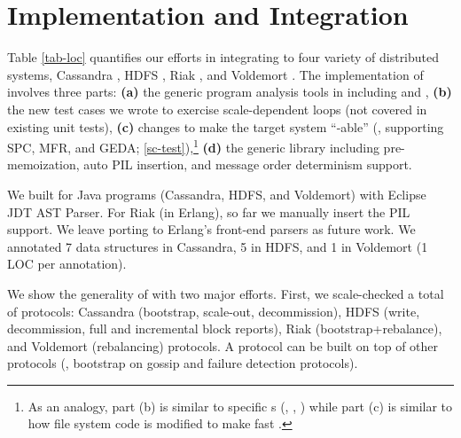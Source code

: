 

\section{Implementation and Integration}
\label{sec-impl}











Table \ref{tab-loc} quantifies our efforts
in integrating \sck 
to four variety of distributed systems, 
Cassandra \cite{Lakshman+09-Cassandra}, 
HDFS \cite{HDFSWeb}, 
Riak \cite{RiakWeb}, and
Voldemort \cite{VoldemortWeb}.
%
The implementation of \sck involves three parts:
%
{\bf (a)} the generic program analysis tools in including \sfind and
\sfindp,
%
{\bf (b)} the new test cases we wrote to 
exercise scale-dependent loops (not covered in existing unit tests),
%
{\bf (c)} changes to make the target system ``\stest-able'' (\ie,
supporting SPC, MFR, and GEDA; \sec\ref{sc-test}),\footnote{As an analogy,
  part (b) is similar to specific s (\eg, ,
  ) while part (c) is similar to how file system code is
  modified to make  fast \cite{Henson+06-Chunkfs, Ma+13-Ffsck}.}
%
{\bf (d)} the generic \stest library including
pre-memoization, auto PIL insertion, and message order determinism support.
%


We built \sfind for Java programs (Cassandra, HDFS, and Voldemort) with
Eclipse JDT AST Parser.  For Riak (in Erlang), so far we manually insert
the PIL support.  We leave porting \sfind to Erlang's front-end parsers
\cite{Erlang-Elvis, Erlang-Dialyzer} as future work.
%
We annotated 7 data structures in Cassandra, 
5 in HDFS, and 1 in Voldemort (1 LOC per annotation).




 We show the generality of \sck with two major
efforts.  First, we scale-checked a total of \numProt protocols:
%
\numProtCass Cassandra (bootstrap, scale-out, decommission),
%
\numProtHDFS HDFS (write, decommission, full and incremental block reports),
%
\numProtRiak Riak (bootstrap+rebalance), and 
%
\numProtVold Voldemort (rebalancing) protocols.
%
A protocol can be built on top of other protocols (\eg, bootstrap on
gossip and failure detection protocols).



